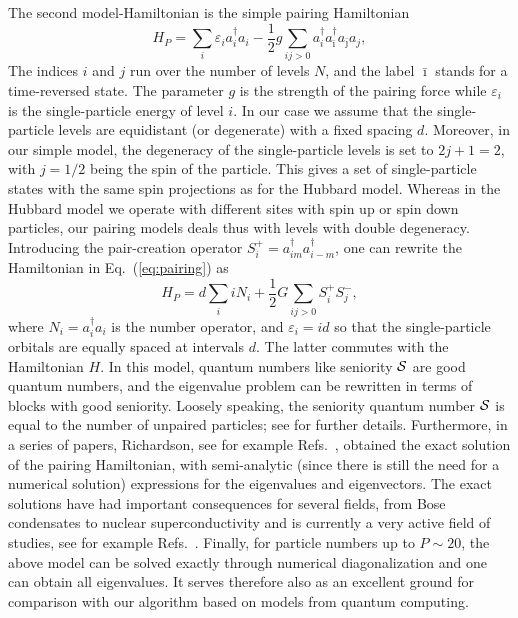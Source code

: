 \documentclass[aps,pra,twocolumn,floatfix]{revtex4}
\begin{document}
The second model-Hamiltonian is the simple pairing Hamiltonian 
\begin{equation}
   H_P=\sum_i \varepsilon_i a^{\dagger}_i a_i -\frac{1}{2} g\sum_{ij>0}
           a^{\dagger}_{i}
     a^{\dagger}_{\bar{\imath}}a_{\bar{\jmath}}a_{j},
     \label{eq:pairing}
\end{equation}
 The indices $i$ and $j$ run over the number of levels $N$, and the label $\bar{\imath}$ 
stands for a time-reversed state. The parameter $g$ is the strength of the pairing force 
while $\varepsilon_i$ is the single-particle energy of level $i$. 
In our case
we assume that the single-particle levels are equidistant (or
degenerate) with a fixed spacing $d$. 
Moreover, in our simple model, the degeneracy of the single-particle
levels is set to $2j+1=2$, with $j=1/2$  
being the spin of the particle. This gives a set of single-particle
states with the same spin projections as 
for the Hubbard model.  Whereas in the Hubbard model we operate with
different sites with  
spin up or spin down particles, our pairing models deals thus with
levels  with double degeneracy. 
Introducing the pair-creation operator 
$S^+_i=a^{\dagger}_{im}a^{\dagger}_{i-m}$,
one can rewrite the Hamiltonian in 
Eq.\ (\ref{eq:pairing}) as
\[
   H_P=d\sum_iiN_i+
     \frac{1}{2} G\sum_{ij>0}S^+_iS^-_j,
\]
where  $N_i=a^{\dagger}_i a_i$
is the number operator, and 
$\varepsilon_i = id$ so that the single-particle orbitals 
are equally spaced at intervals $d$. The latter commutes with the 
Hamiltonian $H$. In this model, quantum numbers like seniority 
$\cal{S}$ are good quantum numbers, and the eigenvalue problem 
can be rewritten in terms of blocks with good seniority. 
Loosely 
speaking, the seniority quantum number $\cal{S}$ is equal to 
the number of unpaired particles; see  \cite{Talmi1993} for 
further details. 
Furthermore, in  a series of papers, Richardson, see for example 
Refs.~\cite{richardson1,richardson2,richardson3},  
obtained the exact solution of the pairing Hamiltonian, with 
semi-analytic (since there is still the need for a numerical solution) 
expressions for the eigenvalues and eigenvectors. The exact solutions
have had important consequences for several fields, from Bose condensates to
nuclear superconductivity and is currently a very active field of studies, see for example
Refs.~\cite{dukelsky2004,rmp75mhj}.
Finally, for particle numbers up to $P \sim 20$, the above model can be 
solved exactly through numerical diagonalization and one can obtain all eigenvalues.
It serves therefore also as an excellent ground for comparison with our algorithm based
on models from quantum computing.
\end{document}
